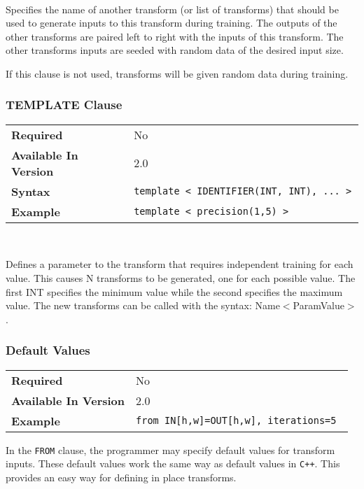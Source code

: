 \documentclass[11pt]{article}
\begin{document}
~

\noindent Specifies the name of another transform (or list of transforms)
that should be used to generate inputs to this transform during training.
The outputs of the other transforms are paired left to right with the inputs
of this transform.  The other transforms inputs are seeded with random data
of the desired input size.

If this clause is not used, transforms will be given random data during
training.

\subsubsection{TEMPLATE Clause}

\begin{tabular}{| l | l |}
\hline
\bf Required & No \\
\bf Available In Version & 2.0            \\
\bf Syntax & \tt template < IDENTIFIER(INT, INT), ... > \\
\bf Example & \tt template < precision(1,5) > \\
\hline
\end{tabular}

~

\noindent Defines a parameter to the transform that requires independent
training for each value.  This causes N transforms to be generated, one for
each possible value.  The first INT specifies the minimum value while the
second specifies the maximum value.  The new transforms can be called with
the syntax: Name$<$ParamValue$>$.

\subsubsection{Default Values}

\begin{tabular}{| l | l |}
\hline
\bf Required & No \\
\bf Available In Version & 2.0            \\
\bf Example & \tt from IN[h,w]=OUT[h,w], iterations=5 \\
\hline
\end{tabular}

In the {\tt FROM} clause, the programmer may specify default values for transform inputs.
These default values work the same way as default values in {\tt C++}.  This provides an easy way for defining in place transforms.
\end{document}
